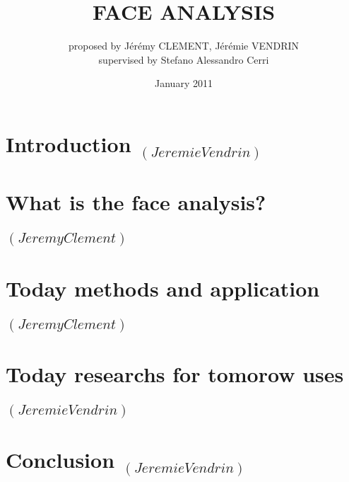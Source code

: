 \documentclass[journal, 11pt,twocolumn]{IEEEtran}
\date{January 2011}
\title{FACE ANALYSIS}
\author{proposed by Jérémy CLEMENT, Jérémie VENDRIN\\ supervised by Stefano Alessandro Cerri }
\begin{document}
	\maketitle
	\thispagestyle{fancy}
	
	\begin{abstract}
		
	\end{abstract}

	\section{Introduction $_{(Jeremie Vendrin)}$}
	

	\section{What is the face analysis? $_{(Jeremy Clement)}$}
	

	\section{Today methods and application $_{(Jeremy Clement)}$}
	

	\section{Today researchs for tomorow uses $_{(Jeremie Vendrin)}$}
	

	\section*{Conclusion $_{(Jeremie Vendrin)}$}
	

	\cite{NPIA}
	\cite{nyuLucasHelen}

	
	
\end{document}
